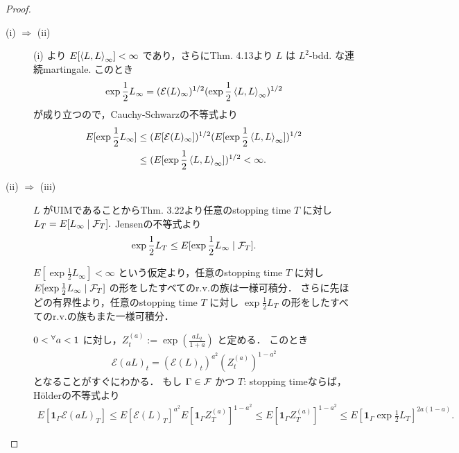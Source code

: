 \documentclass{jsarticle}
\begin{document}
\begin{proof}
    \begin{description}
        \item[(i) $\Rightarrow$ (ii)]
        (i) より $E[\left\langle L,L\right\rangle_{\infty}]<\infty$ であり，さらにThm. 4.13より $L$ は $L^2$-bdd. な連続martingale.
        このとき
        \begin{align}
            \exp\frac{1}{2}L_{\infty}
            = (\mathcal{E}(L)_{\infty})^{1/2}(\exp\frac{1}{2}\left\langle L,L\right\rangle_{\infty})^{1/2}
        \end{align}
        が成り立つので，Cauchy-Schwarzの不等式より
        \begin{align}
            E[\exp\frac{1}{2}L_{\infty}]
            &\le (E[\mathcal{E}(L)_{\infty}])^{1/2}
            (E[\exp\frac{1}{2}\left\langle L,L\right\rangle_{\infty}])^{1/2} \\
            &\le (E[\exp\frac{1}{2}\left\langle L,L\right\rangle_{\infty}])^{1/2}
            < \infty.
        \end{align}
        
        \item[(ii) $\Rightarrow$ (iii)]
        $L$ がUIMであることからThm. 3.22より任意のstopping time $T$ に対し $L_T=E[L_{\infty}\mid\mathcal{F}_T].$
        Jensenの不等式より
        \begin{align}
            \exp\frac{1}{2}L_T
            \le E[\exp\frac{1}{2}L_{\infty}\mid\mathcal{F}_T].
        \end{align}

        $E[\exp\frac{1}{2}L_{\infty}]<\infty$ という仮定より，任意のstopping time $T$ に対し $E[\exp\frac{1}{2}L_{\infty}\mid\mathcal{F}_T]$ の形をしたすべてのr.v.の族は一様可積分．
        さらに先ほどの有界性より，任意のstopping time $T$ に対し $\exp\frac{1}{2}L_T$ の形をしたすべてのr.v.の族もまた一様可積分．

        $0<{}^{\forall} a<1$ に対し，$Z_t^{(a)}:=\exp(\frac{aL_t}{1+a})$ と定める．
        このとき
        \begin{align}
            \mathcal{E}(aL)_t
            = (\mathcal{E}(L)_t)^{a^2}(Z_t^{(a)})^{1-a^2}
        \end{align}
        となることがすぐにわかる．
        もし $\Gamma\in\mathcal{F}$ かつ $T$: stopping timeならば，H\"{o}lderの不等式より
        \begin{align}
            E[\bm{1}_\Gamma\mathcal{E}(aL)_T]
            \le E[\mathcal{E}(L)_T]^{a^2}
            E[\bm{1}_\Gamma Z_T^{(a)}]^{1-a^2}
            \le E[\bm{1}_\Gamma Z_T^{(a)}]^{1-a^2}
            \le E[\bm{1}_\Gamma\exp\frac{1}{2}L_T]^{2a(1-a)}.
        \end{align}


\end{description}
\end{proof}
\end{document}
